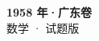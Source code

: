 \documentclass[zihao=-4, a4paper]{ctexart}
\begin{document}
\begin{center}
  {\Large\bfseries 1958 年·广东卷}\\[4pt]
  {\large 数学 · 试题版}
\end{center}
\medskip
{}

\end{document}
